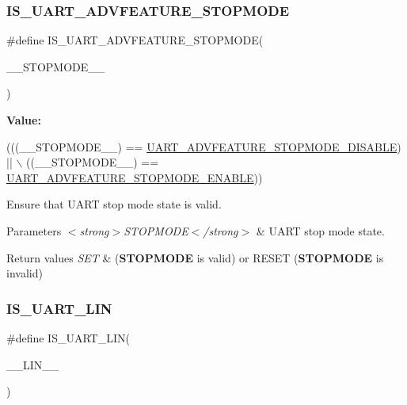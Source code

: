 \subsubsection{\texorpdfstring{I\+S\+\_\+\+U\+A\+R\+T\+\_\+\+A\+D\+V\+F\+E\+A\+T\+U\+R\+E\+\_\+\+S\+T\+O\+P\+M\+O\+DE}{IS\_UART\_ADVFEATURE\_STOPMODE}}
{\footnotesize\ttfamily \#define I\+S\+\_\+\+U\+A\+R\+T\+\_\+\+A\+D\+V\+F\+E\+A\+T\+U\+R\+E\+\_\+\+S\+T\+O\+P\+M\+O\+DE(\begin{DoxyParamCaption}\item[{}]{\+\_\+\+\_\+\+S\+T\+O\+P\+M\+O\+D\+E\+\_\+\+\_\+ }\end{DoxyParamCaption})}

{\bfseries Value\+:}
\begin{DoxyCode}
(((\_\_STOPMODE\_\_) == \hyperlink{group___u_a_r_t___stop___mode___enable_gab6c2929b1d4c2fe0319e412101b5dcc2}{UART\_ADVFEATURE\_STOPMODE\_DISABLE}) || \(\backslash\)
                                                   ((\_\_STOPMODE\_\_) == 
      \hyperlink{group___u_a_r_t___stop___mode___enable_gacc03fae31dda679f071909eeed2e5e22}{UART\_ADVFEATURE\_STOPMODE\_ENABLE}))
\end{DoxyCode}


Ensure that U\+A\+RT stop mode state is valid. 


\begin{DoxyParams}{Parameters}
{\em $<$strong$>$\+S\+T\+O\+P\+M\+O\+D\+E$<$/strong$>$} & U\+A\+RT stop mode state. \\
\hline
\end{DoxyParams}

\begin{DoxyRetVals}{Return values}
{\em S\+ET} & ({\bfseries S\+T\+O\+P\+M\+O\+DE} is valid) or R\+E\+S\+ET ({\bfseries S\+T\+O\+P\+M\+O\+DE} is invalid) \\
\hline
\end{DoxyRetVals}
\mbox{\label{group___u_a_r_t_ex___private___macros_ga13d7f9876db68d9d6316204a8a2588de}} 
\subsubsection{\texorpdfstring{I\+S\+\_\+\+U\+A\+R\+T\+\_\+\+L\+IN}{IS\_UART\_LIN}}
{\footnotesize\ttfamily \#define I\+S\+\_\+\+U\+A\+R\+T\+\_\+\+L\+IN(\begin{DoxyParamCaption}\item[{}]{\+\_\+\+\_\+\+L\+I\+N\+\_\+\+\_\+ }\end{DoxyParamCaption})}

